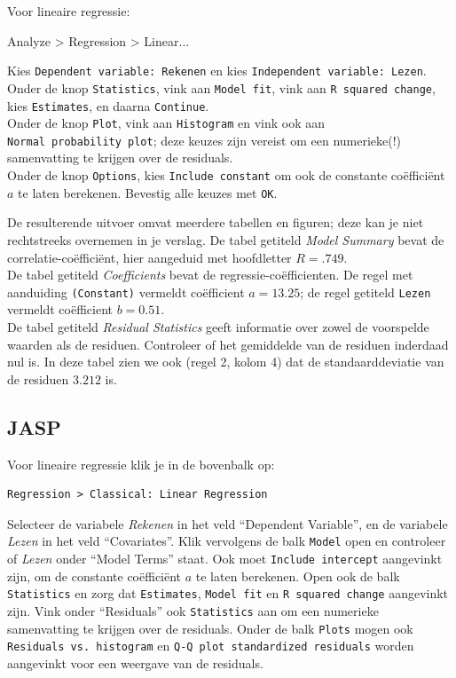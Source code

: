 \documentclass[
]{book}
\newenvironment{Shaded}{\begin{snugshade}}{\end{snugshade}}
\newcommand{\NormalTok}[1]{#1}
\begin{document}
Voor lineaire regressie:

\begin{Shaded}
\begin{Highlighting}[]
\NormalTok{Analyze \textgreater{} Regression \textgreater{} Linear...}
\end{Highlighting}
\end{Shaded}

Kies \texttt{Dependent\ variable:\ Rekenen} en kies
\texttt{Independent\ variable:\ Lezen}. Onder de knop \texttt{Statistics}, vink aan
\texttt{Model\ fit}, vink aan \texttt{R\ squared\ change}, kies \texttt{Estimates}, en daarna
\texttt{Continue}.\\
Onder de knop \texttt{Plot}, vink aan \texttt{Histogram} en vink ook aan
\texttt{Normal\ probability\ plot}; deze keuzes zijn vereist om een numerieke(!)
samenvatting te krijgen over de residuals.\\
Onder de knop \texttt{Options}, kies \texttt{Include\ constant} om ook de constante
coëfficiënt \(a\) te laten berekenen. Bevestig alle keuzes met \texttt{OK}.

De resulterende uitvoer omvat meerdere tabellen en figuren; deze kan je
niet rechtstreeks overnemen in je verslag. De tabel getiteld \emph{Model
Summary} bevat de correlatie-coëfficiënt, hier aangeduid met hoofdletter
\(R=.749\).\\
De tabel getiteld \emph{Coefficients} bevat de regressie-coëfficienten. De
regel met aanduiding \texttt{(Constant)} vermeldt coëfficient \(a=13.25\); de
regel getiteld \texttt{Lezen} vermeldt coëfficient \(b=0.51\).\\
De tabel getiteld \emph{Residual Statistics} geeft informatie over zowel de
voorspelde waarden als de residuen. Controleer of het gemiddelde van de
residuen inderdaad nul is. In deze tabel zien we ook (regel 2, kolom 4)
dat de standaarddeviatie van de residuen \(3.212\) is.

\subsection{JASP}\label{jasp-8}

Voor lineaire regressie klik je in de bovenbalk op:

\begin{verbatim}
Regression > Classical: Linear Regression
\end{verbatim}

Selecteer de variabele \emph{Rekenen} in het veld ``Dependent Variable'', en de variabele \emph{Lezen} in het veld ``Covariates''. Klik vervolgens de balk \texttt{Model} open en controleer of \emph{Lezen} onder ``Model Terms'' staat. Ook moet \texttt{Include\ intercept} aangevinkt zijn, om de constante coëfficiënt \(a\) te laten berekenen. Open ook de balk \texttt{Statistics} en zorg dat \texttt{Estimates}, \texttt{Model\ fit} en \texttt{R\ squared\ change} aangevinkt zijn. Vink onder ``Residuals'' ook \texttt{Statistics} aan om een numerieke samenvatting te krijgen over de residuals. Onder de balk \texttt{Plots} mogen ook \texttt{Residuals\ vs.\ histogram} en \texttt{Q-Q\ plot\ standardized\ residuals} worden aangevinkt voor een weergave van de residuals.
\end{document}
